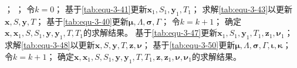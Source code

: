 \begin{center}
\begin{algorithm}[!htbp]
        \caption{定制化的ADMM求解参数同步拓扑优化问题的流程} 
        \label{Algorithm-T-ADMM} 
        \begin{algorithmic}[1]
        ；
        ；
        \STATE 令$k=0$；
            \STATE 基于\autoref{tab:equ-3-41}更新$\mathbf{x}_1,S_1,\mathbf{y}_1,T_1$；
            \STATE 求解\autoref{tab:equ-3-43}以更新$\mathbf{x},S,\mathbf{y},T$；
            \STATE 基于\autoref{tab:equ-3-40}更新$\boldsymbol{\mu },\varLambda ,\boldsymbol{\sigma },\varGamma$；
            \STATE 令$k=k+1$；
        \ENDWHILE
        \STATE 确定$\mathbf{x},\mathbf{x}_1,S,S_1,\mathbf{y},\mathbf{y}_1,T,T_1$的求解结果。
        \ELSE 
            \STATE 基于\autoref{tab:equ-3-47}更新$\mathbf{x}_1,S_1,\mathbf{y}_1,T_1,\mathbf{z}_1,\mathbf{\nu }_1$；
            \STATE 求解\autoref{tab:equ-3-48}以更新$\mathbf{x},S,\mathbf{y},T,\mathbf{z},\mathbf{\nu }$；
            \STATE 基于\autoref{tab:equ-3-50}更新$\boldsymbol{\mu },\varLambda ,\boldsymbol{\sigma },\varGamma,\boldsymbol{\iota },\boldsymbol{\kappa }$；
            \STATE 令$k=k+1$；
        \ENDWHILE
        \STATE 确定$\mathbf{x},\mathbf{x}_1,S,S_1,\mathbf{y},\mathbf{y}_1,T,T_1,\mathbf{z},\mathbf{z}_1,\mathbf{\nu },\mathbf{\nu }_1$的求解结果。
        \ENDIF
        
        \end{algorithmic}
\end{algorithm}
\end{center}

